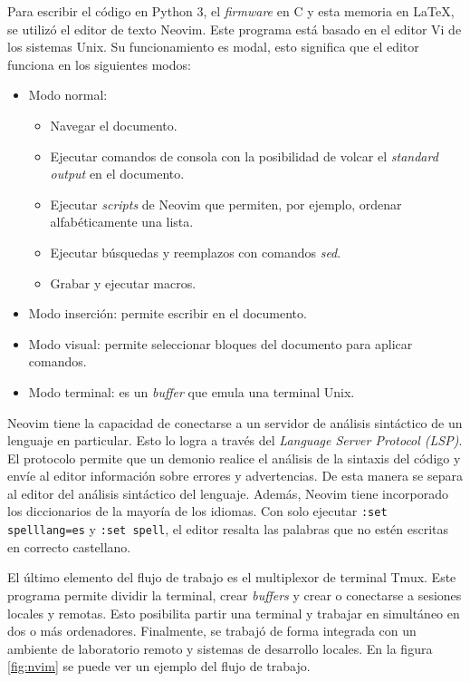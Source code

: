 Para escribir el código en Python 3, el \emph{firmware} en C y esta memoria en \LaTeX, se utilizó el editor de texto Neovim.
Este programa está basado en el editor Vi de los sistemas Unix.
Su funcionamiento es modal, esto significa que el editor funciona en los siguientes modos:

\begin{itemize}
    \item Modo normal:
        \begin{itemize}
            \item Navegar el documento.
            \item Ejecutar comandos de consola con la posibilidad de volcar el \emph{standard output} en el documento.
            \item Ejecutar \emph{scripts} de Neovim que permiten, por ejemplo, ordenar alfabéticamente una lista.
            \item Ejecutar búsquedas y reemplazos con comandos \emph{sed}.
            \item Grabar y ejecutar macros.
        \end{itemize}
    \item Modo inserción: permite escribir en el documento.
    \item Modo visual: permite seleccionar bloques del documento para aplicar comandos.
    \item Modo terminal: es un \emph{buffer} que emula una terminal Unix.
\end{itemize}

Neovim tiene la capacidad de conectarse a un servidor de análisis sintáctico de un lenguaje en particular.
Esto lo logra a través del \emph{Language Server Protocol (LSP)}.
El protocolo permite que un demonio realice el análisis de la sintaxis del código y envíe al editor información sobre errores y advertencias.
De esta manera se separa al editor del análisis sintáctico del lenguaje.
Además, Neovim tiene incorporado los diccionarios de la mayoría de los idiomas. Con solo ejecutar \texttt{:set spelllang=es} y \texttt{:set spell}, el editor resalta las palabras que no estén escritas en correcto castellano.

El último elemento del flujo de trabajo es el multiplexor de terminal Tmux.
Este programa permite dividir la terminal, crear \emph{buffers} y crear o conectarse a sesiones locales y remotas.
Esto posibilita partir una terminal y trabajar en simultáneo en dos o más ordenadores.
Finalmente, se trabajó de forma integrada con un ambiente de laboratorio remoto y sistemas de desarrollo locales.
En la figura \ref{fig:nvim} se puede ver un ejemplo del flujo de trabajo.

